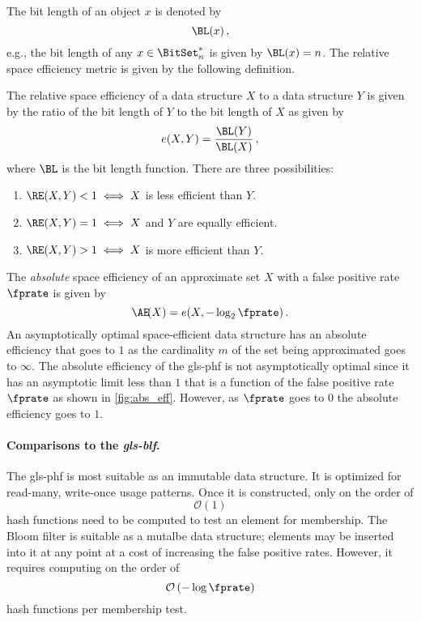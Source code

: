 \documentclass[ ../main.tex]{subfiles}
\begin{document}
The bit length of an object $x$ is denoted by
\begin{equation}
    \BL(x)\,,
\end{equation}
e.g., the bit length of any $x \in \BitSet^*_n$ is given by $\BL(x) = n$. The relative space efficiency metric is given by the following definition.
\begin{definition}
The relative space efficiency of a data structure $X$ to a data structure $Y$ is given by the ratio of the bit length of $Y$ to the bit length of $X$ as given by
\begin{equation}
    e(X,Y)=\frac{\BL(Y)}{\BL(X)}\,,
\end{equation}
where $\BL$ is the bit length function. There are three possibilities:
\begin{enumerate}
    \item $\RE(X,Y) < 1 \iff X$ is less efficient than $Y$.
    \item $\RE(X,Y) = 1 \iff X$ and $Y$ are equally efficient.
    \item $\RE(X,Y) > 1 \iff X$ is more efficient than $Y$.
\end{enumerate}
\end{definition}

The \emph{absolute} space efficiency of an approximate set $X$ with a false positive rate $\fprate$ is given by
\begin{equation}
    \AE\!(X) = e(X,-\log_2 \fprate)\,.
\end{equation}
An asymptotically optimal space-efficient data structure has an absolute efficiency that goes to $1$ as the cardinality $m$ of the set being approximated goes to $\infty$. The absolute efficiency of the \gls{gls-phf} is not asymptotically optimal since it has an asymptotic limit less than $1$ that is a function of the false positive rate $\fprate$ as shown in \cref{fig:abs_eff}. However, as $\fprate$ goes to $0$ the absolute efficiency goes to $1$.

\paragraph{Comparisons to the \emph{\gls{gls-blf}}.}
The \gls{gls-phf} is most suitable as an immutable data structure. It is optimized for read-many, write-once usage patterns. Once it is constructed, only on the order of
\begin{equation}
    \mathcal{O} \left( 1 \right)
\end{equation}
hash functions need to be computed to test an element for membership. The Bloom filter is suitable as a mutalbe data structure; elements may be inserted into it at any point at a cost of increasing the false positive rates. However, it requires computing on the order of
\begin{equation}
    \mathcal{O}\left(-\log \fprate\right)
\end{equation}
hash functions per membership test.
\end{document}
